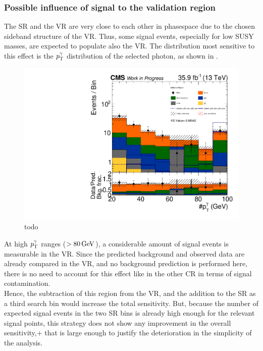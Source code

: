 \subsubsection*{Possible influence of signal to the validation region}
The SR and the VR are very close to each other in phasespace due to the chosen sideband structure of the VR. Thus, some signal events, especially for low SUSY masses, are expected to populate also the VR. The distribution most sensitive to this effect is the $p_{\mathrm{T}}^{\gamma}$ distribution of the selected photon, as shown in .
\begin{figure}[tbp]
 \centering
 \includegraphics[width=\pairwidth]{figures/VR_signal_study/VR_LL_pt_g1_log}
 \caption{todo}
 \label{fig:signalContVR}
\end{figure}
At high $p_{\mathrm{T}}^{\gamma}$ ranges ($>80\,\text{Ge\hspace{-.08em}V}$), a considerable amount of signal events is measurable in the VR. Since the predicted background and observed data are already compared in the VR, and no background prediction is performed here, there is no need to account for this effect like in the other CR in terms of signal contamination.\\
Hence, the subtraction of this region from the VR, and the addition to the SR as a third search bin would increase the total sensitivity. But, because the number of expected signal events in the two SR bins is  already high enough for the relevant signal points, this strategy does not show any improvement in the overall sensitivity,+ that is large enough to justify the deterioration in the simplicity of the analysis.

